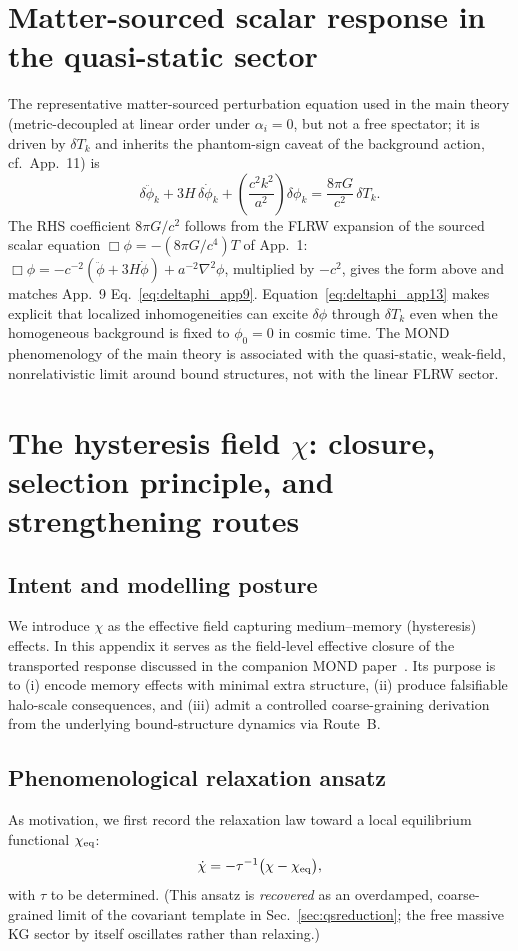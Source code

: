 \documentclass[11pt]{article}
\begin{document}
\section{Matter-sourced scalar response in the quasi-static sector}\label{sec:deltaphi}
The representative matter-sourced perturbation equation used in the main theory (metric-decoupled at linear order under $\alpha_i=0$, but not a free spectator; it is driven by $\delta T_k$ and inherits the phantom-sign caveat of the background action, cf.\ App.~11) is
\begin{equation}
\delta\ddot{\phi}_k + 3H\,\delta\dot{\phi}_k + \left(\frac{c^2k^2}{a^2}\right)\delta\phi_k = \frac{8\pi G}{c^2}\,\delta T_k.
\label{eq:deltaphi_app13}
\end{equation}
The RHS coefficient $8\pi G/c^2$ follows from the FLRW expansion of the sourced scalar equation $\Box\phi=-(8\pi G/c^4)T$ of App.~1: $\Box\phi=-c^{-2}(\ddot\phi+3H\dot\phi)+a^{-2}\nabla^2\phi$, multiplied by $-c^2$, gives the form above and matches App.~9 Eq.~\eqref{eq:deltaphi_app9}.
Equation~\eqref{eq:deltaphi_app13} makes explicit that localized inhomogeneities can excite $\delta\phi$ through $\delta T_k$ even when the homogeneous background is fixed to $\phi_0=0$ in cosmic time. The MOND phenomenology of the main theory is associated with the quasi-static, weak-field, nonrelativistic limit around bound structures, not with the linear FLRW sector.

\section{The hysteresis field $\chi$: closure, selection principle, and strengthening routes}\label{sec:chi}
\subsection{Intent and modelling posture}
We introduce $\chi$ as the effective field capturing medium--memory (hysteresis) effects. In this appendix it serves as the field-level effective closure of the transported response discussed in the companion MOND paper~\cite{Lotishvili2026MOND}. Its purpose is to (i) encode memory effects with minimal extra structure, (ii) produce falsifiable halo-scale consequences, and (iii) admit a controlled coarse-graining derivation from the underlying bound-structure dynamics via Route~B.

\subsection{Phenomenological relaxation ansatz}
As motivation, we first record the relaxation law toward a local equilibrium functional $\chi_{\rm eq}$:
\begin{equation}
\dot{\chi} = -\tau^{-1}\big(\chi-\chi_{\rm eq}\big),
\label{eq:chi1}
\end{equation}
with $\tau$ to be determined.  (This ansatz is \emph{recovered}
as an overdamped, coarse-grained limit of the covariant template
in Sec.~\ref{sec:qsreduction}; the free massive KG sector by itself
oscillates rather than relaxing.)
\end{document}
